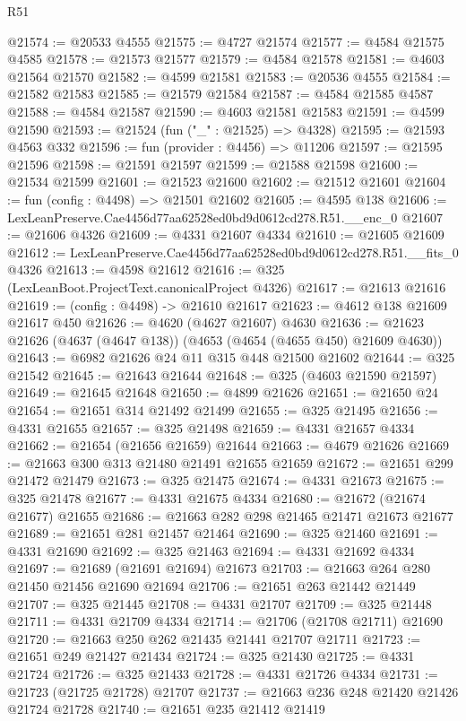 \begin{lexlean}{R51}
\begin{coremodule}
@21574 := @20533 @4555
@21575 := @4727 @21574
@21577 := @4584 @21575 @4585
@21578 := @21573 @21577
@21579 := @4584 @21578
@21581 := @4603 @21564 @21570
@21582 := @4599 @21581
@21583 := @20536 @4555
@21584 := @21582 @21583
@21585 := @21579 @21584
@21587 := @4584 @21585 @4587
@21588 := @4584 @21587
@21590 := @4603 @21581 @21583
@21591 := @4599 @21590
@21593 := @21524 (fun ("_" : @21525) => @4328)
@21595 := @21593 @4563 @332
@21596 := fun (provider : @4456) => @11206
@21597 := @21595 @21596
@21598 := @21591 @21597
@21599 := @21588 @21598
@21600 := @21534 @21599
@21601 := @21523 @21600
@21602 := @21512 @21601
@21604 := fun (config : @4498) => @21501 @21602
@21605 := @4595 @138
@21606 := LexLeanPreserve.Cae4456d77aa62528ed0bd9d0612cd278.R51.__enc_0
@21607 := @21606 @4326
@21609 := @4331 @21607 @4334
@21610 := @21605 @21609
@21612 := LexLeanPreserve.Cae4456d77aa62528ed0bd9d0612cd278.R51.__fits_0 @4326
@21613 := @4598 @21612
@21616 := @325 (LexLeanBoot.ProjectText.canonicalProject @4326)
@21617 := @21613 @21616
@21619 := (config : @4498) -> @21610 @21617
@21623 := @4612 @138 @21609 @21617 @450
@21626 := @4620 (@4627 @21607) @4630
@21636 := @21623 @21626 (@4637 (@4647 @138)) (@4653 (@4654 (@4655 @450) @21609 @4630))
@21643 := @6982 @21626 @24 @11 @315 @448 @21500 @21602
@21644 := @325 @21542
@21645 := @21643 @21644
@21648 := @325 (@4603 @21590 @21597)
@21649 := @21645 @21648
@21650 := @4899 @21626
@21651 := @21650 @24
@21654 := @21651 @314 @21492 @21499
@21655 := @325 @21495
@21656 := @4331 @21655
@21657 := @325 @21498
@21659 := @4331 @21657 @4334
@21662 := @21654 (@21656 @21659) @21644
@21663 := @4679 @21626
@21669 := @21663 @300 @313 @21480 @21491 @21655 @21659
@21672 := @21651 @299 @21472 @21479
@21673 := @325 @21475
@21674 := @4331 @21673
@21675 := @325 @21478
@21677 := @4331 @21675 @4334
@21680 := @21672 (@21674 @21677) @21655
@21686 := @21663 @282 @298 @21465 @21471 @21673 @21677
@21689 := @21651 @281 @21457 @21464
@21690 := @325 @21460
@21691 := @4331 @21690
@21692 := @325 @21463
@21694 := @4331 @21692 @4334
@21697 := @21689 (@21691 @21694) @21673
@21703 := @21663 @264 @280 @21450 @21456 @21690 @21694
@21706 := @21651 @263 @21442 @21449
@21707 := @325 @21445
@21708 := @4331 @21707
@21709 := @325 @21448
@21711 := @4331 @21709 @4334
@21714 := @21706 (@21708 @21711) @21690
@21720 := @21663 @250 @262 @21435 @21441 @21707 @21711
@21723 := @21651 @249 @21427 @21434
@21724 := @325 @21430
@21725 := @4331 @21724
@21726 := @325 @21433
@21728 := @4331 @21726 @4334
@21731 := @21723 (@21725 @21728) @21707
@21737 := @21663 @236 @248 @21420 @21426 @21724 @21728
@21740 := @21651 @235 @21412 @21419

\end{coremodule}
\end{lexlean}
